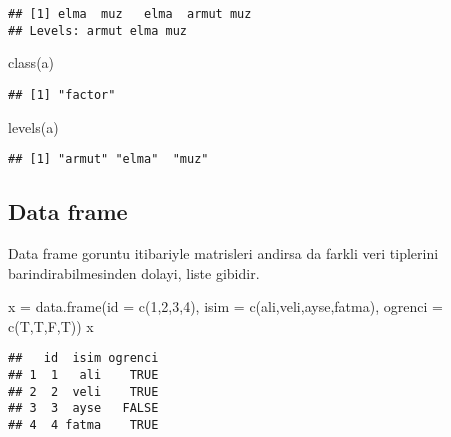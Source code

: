 \documentclass[
]{book}
\newenvironment{Shaded}{\begin{snugshade}}{\end{snugshade}}
\newcommand{\AttributeTok}[1]{\textcolor[rgb]{0.77,0.63,0.00}{#1}}
\newcommand{\DecValTok}[1]{\textcolor[rgb]{0.00,0.00,0.81}{#1}}
\newcommand{\FunctionTok}[1]{\textcolor[rgb]{0.00,0.00,0.00}{#1}}
\newcommand{\NormalTok}[1]{#1}
\newcommand{\OtherTok}[1]{\textcolor[rgb]{0.56,0.35,0.01}{#1}}
\newcommand{\StringTok}[1]{\textcolor[rgb]{0.31,0.60,0.02}{#1}}
\begin{document}
\begin{verbatim}
## [1] elma  muz   elma  armut muz  
## Levels: armut elma muz
\end{verbatim}

\begin{Shaded}
\begin{Highlighting}[]
\FunctionTok{class}\NormalTok{(a)}
\end{Highlighting}
\end{Shaded}

\begin{verbatim}
## [1] "factor"
\end{verbatim}

\begin{Shaded}
\begin{Highlighting}[]
\FunctionTok{levels}\NormalTok{(a)}
\end{Highlighting}
\end{Shaded}

\begin{verbatim}
## [1] "armut" "elma"  "muz"
\end{verbatim}

\hypertarget{data-frame}{%
\subsection{Data frame}\label{data-frame}}

Data frame goruntu itibariyle matrisleri andirsa da farkli veri tiplerini barindirabilmesinden dolayi, liste gibidir.

\begin{Shaded}
\begin{Highlighting}[]
\NormalTok{x }\OtherTok{=} \FunctionTok{data.frame}\NormalTok{(}\AttributeTok{id =} \FunctionTok{c}\NormalTok{(}\DecValTok{1}\NormalTok{,}\DecValTok{2}\NormalTok{,}\DecValTok{3}\NormalTok{,}\DecValTok{4}\NormalTok{),}
               \AttributeTok{isim =} \FunctionTok{c}\NormalTok{(}\StringTok{\textquotesingle{}ali\textquotesingle{}}\NormalTok{,}\StringTok{\textquotesingle{}veli\textquotesingle{}}\NormalTok{,}\StringTok{\textquotesingle{}ayse\textquotesingle{}}\NormalTok{,}\StringTok{\textquotesingle{}fatma\textquotesingle{}}\NormalTok{), }
               \AttributeTok{ogrenci =} \FunctionTok{c}\NormalTok{(T,T,F,T))}
\NormalTok{x}
\end{Highlighting}
\end{Shaded}

\begin{verbatim}
##   id  isim ogrenci
## 1  1   ali    TRUE
## 2  2  veli    TRUE
## 3  3  ayse   FALSE
## 4  4 fatma    TRUE
\end{verbatim}
\end{document}
